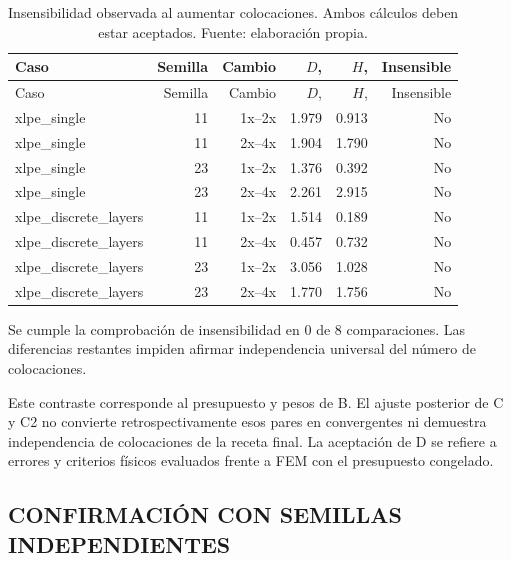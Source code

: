 \begingroup\footnotesize\setlength{\tabcolsep}{3pt}
\begin{longtable}{L{4.2cm}rrrrr}
\caption{Insensibilidad observada al aumentar colocaciones. Ambos cálculos deben estar aceptados. Fuente: elaboración propia.}\label{tab:explicit-convergence}\\
\toprule
Caso & Semilla & Cambio & $D$, \pct{} & $H$, \pct{} & Insensible\\
\midrule\endfirsthead
\toprule
Caso & Semilla & Cambio & $D$, \pct{} & $H$, \pct{} & Insensible\\
\midrule\endhead
xlpe\_single & 11 & 1x--2x & 1.979 & 0.913 & No\\
xlpe\_single & 11 & 2x--4x & 1.904 & 1.790 & No\\
xlpe\_single & 23 & 1x--2x & 1.376 & 0.392 & No\\
xlpe\_single & 23 & 2x--4x & 2.261 & 2.915 & No\\
xlpe\_discrete\_layers & 11 & 1x--2x & 1.514 & 0.189 & No\\
xlpe\_discrete\_layers & 11 & 2x--4x & 0.457 & 0.732 & No\\
xlpe\_discrete\_layers & 23 & 1x--2x & 3.056 & 1.028 & No\\
xlpe\_discrete\_layers & 23 & 2x--4x & 1.770 & 1.756 & No\\
\bottomrule\end{longtable}\endgroup

Se cumple la comprobación de insensibilidad en 0 de 8 comparaciones. Las diferencias restantes impiden afirmar independencia universal del número de colocaciones.

Este contraste corresponde al presupuesto y pesos de B. El ajuste posterior de C y C2 no convierte retrospectivamente esos pares en convergentes ni demuestra independencia de colocaciones de la receta final. La aceptación de D se refiere a errores y criterios físicos evaluados frente a FEM con el presupuesto congelado.

\subsection{CONFIRMACIÓN CON SEMILLAS INDEPENDIENTES}

